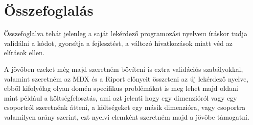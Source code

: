 \chapter{Összefoglalás}\label{sect:Summary}
Összefoglalva tehát jelenleg a saját lekérdező programozási nyelvem íráskor tudja validálni a kódot, gyorsítja a fejlesztést, a változó hivatkozások miatt véd az elírások ellen.

A jövőben ezeket még majd szeretném bővíteni is extra validációs szabályokkal, valamint szeretném az MDX és a Riport előnyeit összeteni az új lekérdező nyelve, ebből kifolyólag olyan domén specifikus problémákat is meg lehet majd oldani mint például a költségfelosztás, ami azt jelenti hogy egy dimenzióról vagy egy csoportról szeretnénk átteni, a költségeket egy másik dimenzióra, vagy csoportra valamilyen arány szerint, ezt nyelvi elemként szeretném majd a jövőbe támogatni.
